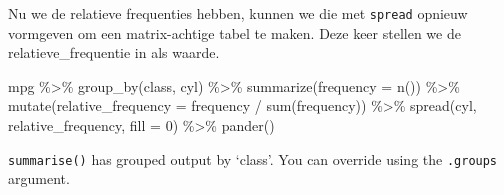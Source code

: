 \documentclass[]{tufte-book}
\newenvironment{Shaded}{}{}
\newcommand{\AttributeTok}[1]{\textcolor[rgb]{0.49,0.56,0.16}{#1}}
\newcommand{\DecValTok}[1]{\textcolor[rgb]{0.25,0.63,0.44}{#1}}
\newcommand{\FunctionTok}[1]{\textcolor[rgb]{0.02,0.16,0.49}{#1}}
\newcommand{\NormalTok}[1]{#1}
\newcommand{\SpecialCharTok}[1]{\textcolor[rgb]{0.25,0.44,0.63}{#1}}
\begin{document}
Nu we de relatieve frequenties hebben, kunnen we die met \texttt{spread} opnieuw vormgeven om een matrix-achtige tabel te maken. Deze keer stellen we de relatieve\_frequentie in als waarde.

\begin{Shaded}
\begin{Highlighting}[]
\NormalTok{mpg }\SpecialCharTok{\%\textgreater{}\%}
  \FunctionTok{group\_by}\NormalTok{(class, cyl) }\SpecialCharTok{\%\textgreater{}\%}
  \FunctionTok{summarize}\NormalTok{(}\AttributeTok{frequency =} \FunctionTok{n}\NormalTok{()) }\SpecialCharTok{\%\textgreater{}\%}
  \FunctionTok{mutate}\NormalTok{(}\AttributeTok{relative\_frequency =}\NormalTok{ frequency }\SpecialCharTok{/} \FunctionTok{sum}\NormalTok{(frequency)) }\SpecialCharTok{\%\textgreater{}\%}
  \FunctionTok{spread}\NormalTok{(cyl, relative\_frequency, }\AttributeTok{fill =} \DecValTok{0}\NormalTok{) }\SpecialCharTok{\%\textgreater{}\%}
  \FunctionTok{pander}\NormalTok{()}
\end{Highlighting}
\end{Shaded}

\texttt{summarise()} has grouped output by `class'. You can override using the \texttt{.groups} argument.
\end{document}
